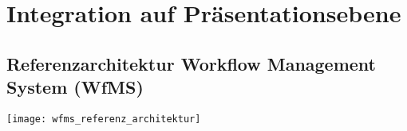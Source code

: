 
\section{Integration auf Präsentationsebene}
\subsection{Referenzarchitektur Workflow Management System (WfMS)}
\texttt{[image: wfms\_referenz\_architektur]}
